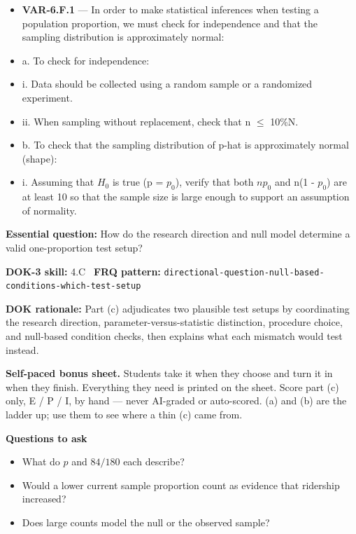 \documentclass[11pt]{article}
\begin{document}
{\begin{itemize}[leftmargin=1.5em,itemsep=2pt,topsep=2pt]
  \item \textbf{VAR-6.F.1} --- In order to make statistical inferences when testing a population proportion, we must check for independence and that the sampling distribution is approximately normal:
  \item a. To check for independence:
  \item i. Data should be collected using a random sample or a randomized experiment.
  \item ii. When sampling without replacement, check that n $\leq$ 10\%N.
  \item b. To check that the sampling distribution of p-hat is approximately normal (shape):
  \item i. Assuming that $H_0$ is true (p = $p_0$), verify that both $np_0$ and n(1 - $p_0$) are at least 10 so that the sample size is large enough to support an assumption of normality.
\end{itemize}
}
\textbf{Essential question:} How do the research direction and null model determine a valid one-proportion test setup?\par
\textbf{DOK-3 skill:} 4.C \textperiodcentered\ \textbf{FRQ pattern:} {\small\texttt{directional-\allowbreak{}question-\allowbreak{}null-\allowbreak{}based-\allowbreak{}conditions-\allowbreak{}which-\allowbreak{}test-\allowbreak{}setup}}\par
\textbf{DOK rationale:} Part (c) adjudicates two plausible test setups by coordinating the research direction, parameter-versus-statistic distinction, procedure choice, and null-based condition checks, then explains what each mismatch would test instead.\par

\textbf{Self-paced bonus sheet.} Students take it when they choose and turn it in when they finish. Everything they need is printed on the sheet. Score part (c) only, E / P / I, by hand --- never AI-graded or auto-scored. (a) and (b) are the ladder up; use them to see where a thin (c) came from.\par

\textbf{Questions to ask}
\begin{itemize}[leftmargin=1.5em,itemsep=2pt,topsep=2pt]
  \item What do $p$ and $84/180$ each describe?
  \item Would a lower current sample proportion count as evidence that ridership increased?
  \item Does large counts model the null or the observed sample?
\end{itemize}
\end{document}
